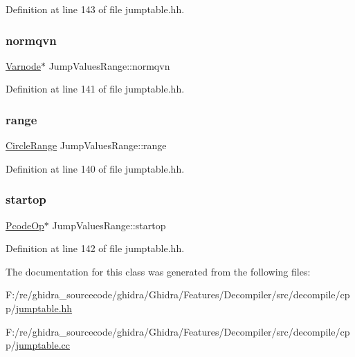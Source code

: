 Definition at line 143 of file jumptable.\+hh.

\mbox{\label{class_jump_values_range_aa3d96b6af86c45bd140407a40e98026b}} 
\subsubsection{\texorpdfstring{normqvn}{normqvn}}
{\footnotesize\ttfamily \mbox{\hyperlink{class_varnode}{Varnode}}$\ast$ Jump\+Values\+Range\+::normqvn\hspace{0.3cm}{\ttfamily [protected]}}



Definition at line 141 of file jumptable.\+hh.

\mbox{\label{class_jump_values_range_a28e88d63fc5449372482bf0fc81f7f8d}} 
\subsubsection{\texorpdfstring{range}{range}}
{\footnotesize\ttfamily \mbox{\hyperlink{class_circle_range}{Circle\+Range}} Jump\+Values\+Range\+::range\hspace{0.3cm}{\ttfamily [protected]}}



Definition at line 140 of file jumptable.\+hh.

\mbox{\label{class_jump_values_range_ac4da92c4190bf9f22662c9526075bd9c}} 
\subsubsection{\texorpdfstring{startop}{startop}}
{\footnotesize\ttfamily \mbox{\hyperlink{class_pcode_op}{Pcode\+Op}}$\ast$ Jump\+Values\+Range\+::startop\hspace{0.3cm}{\ttfamily [protected]}}



Definition at line 142 of file jumptable.\+hh.



The documentation for this class was generated from the following files\+:\begin{DoxyCompactItemize}
\item 
F\+:/re/ghidra\+\_\+sourcecode/ghidra/\+Ghidra/\+Features/\+Decompiler/src/decompile/cpp/\mbox{\hyperlink{jumptable_8hh}{jumptable.\+hh}}\item 
F\+:/re/ghidra\+\_\+sourcecode/ghidra/\+Ghidra/\+Features/\+Decompiler/src/decompile/cpp/\mbox{\hyperlink{jumptable_8cc}{jumptable.\+cc}}\end{DoxyCompactItemize}
